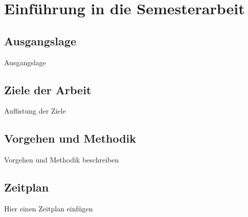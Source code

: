 \section{Einführung in die Semesterarbeit}

\subsection{Ausgangslage}
Ausgangslage

\subsection{Ziele der Arbeit}
Auflistung der Ziele

\subsection{Vorgehen und Methodik}
Vorgehen und Methodik beschreiben

\subsection{Zeitplan}
Hier einen Zeitplan einfügen
